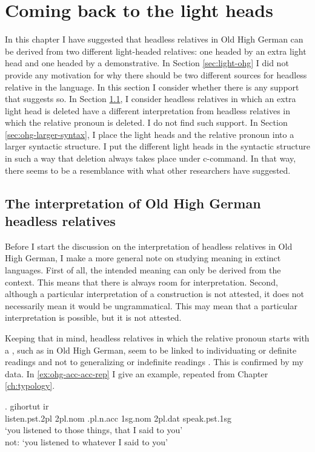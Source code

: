 \section{Coming back to the light heads}\label{sec:coming-back}

In this chapter I have suggested that headless relatives in Old High German can be derived from two different light-headed relatives: one headed by an extra light head and one headed by a demonstrative.
In Section \ref{sec:light-ohg} I did not provide any motivation for why there should be two different sources for headless relative in the language.
In this section I consider whether there is any support that suggests so.
In Section \ref{sec:interpretation-ohg}, I consider headless relatives in which an extra light head is deleted have a different interpretation from headless relatives in which the relative pronoun is deleted. I do not find such support.
In Section \ref{sec:ohg-larger-syntax}, I place the light heads and the relative pronoun into a larger syntactic structure. I put the different light heads in the syntactic structure in such a way that deletion always takes place under c-command. In that way, there seems to be a resemblance with what other researchers have suggested.

\subsection{The interpretation of Old High German headless relatives}\label{sec:interpretation-ohg}

Before I start the discussion on the interpretation of headless relatives in Old High German, I make a more general note on studying meaning in extinct languages. First of all, the intended meaning can only be derived from the context. This means that there is always room for interpretation. Second, although a particular interpretation of a construction is not attested, it does not necessarily mean it would be ungrammatical. This may mean that a particular interpretation is possible, but it is not attested.

Keeping that in mind, headless relatives in which the relative pronoun starts with a , such as in Old High German, seem to be linked to individuating or definite readings and not to generalizing or indefinite readings \citep[cf.][]{fuss2017}. This is confirmed by my data. In \ref{ex:ohg-acc-acc-rep} I give an example, repeated from Chapter \ref{ch:typology}.

\exg. gihortut ir    \\
 listen.\ac{pst}.2\ac{pl}\scsub{[acc]} 2\ac{pl}.\ac{nom} .\ac{pl}.\ac{n}.\ac{acc} 1\ac{sg}.\ac{nom} 2\ac{pl}.\ac{dat} speak.\ac{pst}.1\ac{sg}\scsub{[acc]}\\
 `you listened to those things, that I said to you'\\
 not: `you listened to whatever I said to you' \label{ex:ohg-acc-acc-rep}

